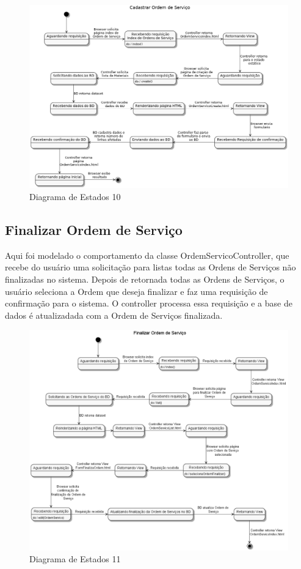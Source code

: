 \documentclass[rascunho,xindy,acronym,symbols]{fei}
\begin{document}
\begin{figure}[H]
    \centering
    \includegraphics[width=\textwidth]{./Images/DE_Cadastrar_Ordem_Servico.png}
    \caption{Diagrama de Estados 10}
    \label{fig:diag_est10}
\end{figure}

\subsection{Finalizar Ordem de Serviço}

Aqui foi modelado o comportamento da classe OrdemServicoController, que recebe do usuário uma solicitação para listas todas as Ordens de Serviços não finalizadas no sistema. Depois de retornada todas as Ordens de Serviços, o usuário seleciona a Ordem que deseja finalizar e faz uma requisição de confirmação para o sistema. O controller processa essa requisição e a base de dados é atualizadada com a Ordem de Serviços finalizada.

\begin{figure}[H]
    \centering
    \includegraphics[width=\textwidth]{./Images/DE_-_Finalizar_Ordem_de_Servico.png}
    \caption{Diagrama de Estados 11}
    \label{fig:diag_est11}
\end{figure}
\end{document}
